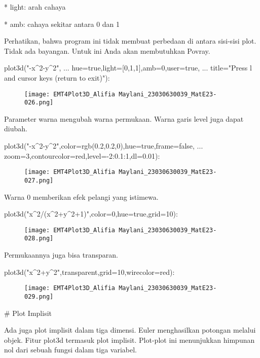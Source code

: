 \documentclass{article}
\begin{document}
* 
light: arah cahaya

* 
amb: cahaya sekitar antara 0 dan 1


Perhatikan, bahwa program ini tidak membuat perbedaan di antara
sisi-sisi plot. Tidak ada bayangan. Untuk ini Anda akan membutuhkan
Povray.


\>plot3d("-x^2-y^2", ...  
\>     hue=true,light=[0,1,1],amb=0,user=true, ...  
\>     title="Press l and cursor keys (return to exit)"):


\begin{figure}
    \centering
    \texttt{[image: EMT4Plot3D\_Alifia Maylani\_23030630039\_MatE23-026.png]}
    \caption{}
    \label{fig:enter-label}
\end{figure}

Parameter warna mengubah warna permukaan. Warna garis level juga dapat
diubah.


\>plot3d("-x^2-y^2",color=rgb(0.2,0.2,0),hue=true,frame=false, ...  
\>     zoom=3,contourcolor=red,level=-2:0.1:1,dl=0.01):


\begin{figure}
    \centering
    \texttt{[image: EMT4Plot3D\_Alifia Maylani\_23030630039\_MatE23-027.png]}
    \caption{}
    \label{fig:enter-label}
\end{figure}

Warna 0 memberikan efek pelangi yang istimewa.


\>plot3d("x^2/(x^2+y^2+1)",color=0,hue=true,grid=10):


\begin{figure}
    \centering
    \texttt{[image: EMT4Plot3D\_Alifia Maylani\_23030630039\_MatE23-028.png]}
    \caption{}
    \label{fig:enter-label}
\end{figure}

Permukaannya juga bisa transparan.


\>plot3d("x^2+y^2",\>transparent,grid=10,wirecolor=red):


\begin{figure}
    \centering
    \texttt{[image: EMT4Plot3D\_Alifia Maylani\_23030630039\_MatE23-029.png]}
    \caption{}
    \label{fig:enter-label}
\end{figure}

# Plot Implisit

Ada juga plot implisit dalam tiga dimensi. Euler menghasilkan potongan
melalui objek. Fitur plot3d termasuk plot implisit. Plot-plot ini
menunjukkan himpunan nol dari sebuah fungsi dalam tiga variabel.
\end{document}
